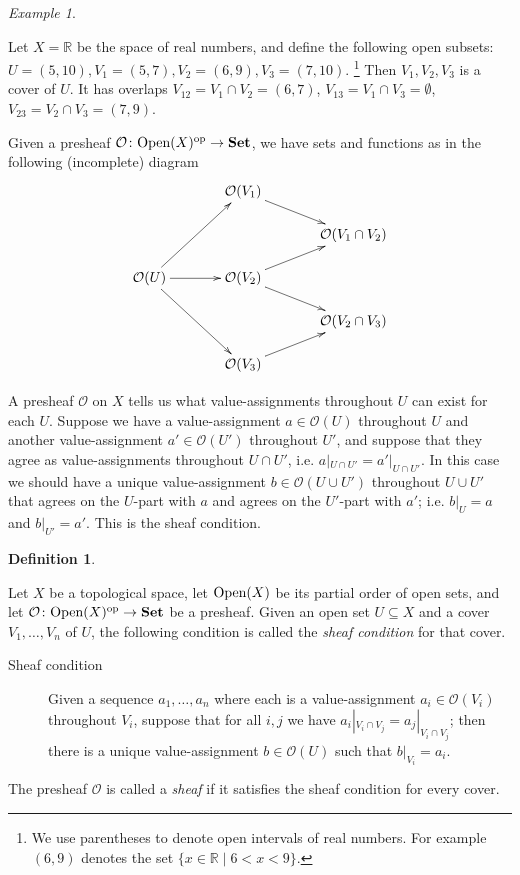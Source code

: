 \documentclass{book}
\def\tn{\textnormal}
\def\mc{\mathcal}
\def\RR{{\mathbb R}}
\def\Op{\tn{Open}}
\def\to{\rightarrow}
\def\taking{\colon}
\def\ss{\subseteq}
\def\|{{\;|\;}}
\def\op{^\tn{op}}
\def\Set{{\bf Set}}
\def\mcO{\mc{O}}
\theoremstyle{remark}
\newtheorem{example}[subsubsection]{Example}
\theoremstyle{definition}
\newtheorem{definition}[subsubsection]{Definition}
\begin{document}
\begin{example}\label{ex:open cover}

Let $X=\RR$ be the space of real numbers, and define the following open subsets: $U=(5,10), V_1=(5,7), V_2=(6,9), V_3=(7,10)$.
\footnote{We use parentheses to denote open intervals of real numbers. For example $(6,9)$ denotes the set $\{x\in\RR\|6<x<9\}$.} 
Then $V_1, V_2, V_3$ is a cover of $U$. It has overlaps $V_{12}=V_1\cap V_2=(6,7)$, $V_{13}=V_1\cap V_3=\emptyset$, $V_{23}=V_2\cap V_3=(7,9)$. 

Given a presheaf $\mcO\taking\Op(X)\op\to\Set$, we have sets and functions as in the following (incomplete) diagram
$$
\xymatrix@=15pt{
&&\mcO(V_1)\ar[drr]\\
&&&&\mcO(V_1\cap V_2)\\
\mcO(U)\ar[uurr]\ar[rr]\ar[ddrr]&&\mcO(V_2)\ar[urr]\ar[drr]\\
&&&&\mcO(V_2\cap V_3)\\
&&\mcO(V_3)\ar[urr]
}
$$

\end{example}

A presheaf $\mcO$ on $X$ tells us what value-assignments throughout $U$ can exist for each $U$. Suppose we have a value-assignment $a\in\mcO(U)$ throughout $U$ and another value-assignment $a'\in\mcO(U')$ throughout $U'$, and suppose that they agree as value-assignments throughout $U\cap U'$, i.e. $a|_{U\cap U'}=a'|_{U\cap U'}$. In this case we should have a unique value-assignment $b\in\mcO(U\cup U')$ throughout $U\cup U'$ that agrees on the $U$-part with $a$ and agrees on the $U'$-part with $a'$; i.e. $b|_U=a$ and $b|_{U'}=a'$. This is the sheaf condition. 

\begin{definition}\label{def:sheaf}

Let $X$ be a topological space, let $\Op(X)$ be its partial order of open sets, and let $\mcO\taking\Op(X)\op\to\Set$ be a presheaf. Given an open set $U\ss X$ and a cover $V_1,\ldots, V_n$ of $U$, the following condition is called the {\em sheaf condition} for that cover. 
\begin{description}
\item [Sheaf condition] Given a sequence $a_1,\ldots,a_n$ where each is a value-assignment $a_i\in\mcO(V_i)$ throughout $V_i$, suppose that for all $i,j$ we have $a_i|_{V_i\cap V_j}=a_j|_{V_i\cap V_j}$; then there is a unique value-assignment $b\in\mcO(U)$ such that $b|_{V_i}=a_i$.
\end{description}
The presheaf $\mcO$ is called a {\em sheaf} if it satisfies the sheaf condition for every cover.

\end{definition}
\end{document}
